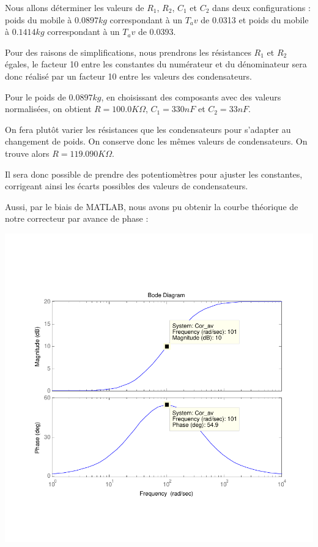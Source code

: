 \documentclass[11pt, french]{article} %
\begin{document}
Nous allons déterminer les valeurs de $R_1$, $R_2$, $C_1$ et $C_2$ dans deux configurations : poids du mobile à $0.0897 kg$ correspondant à un $T_av$ de 0.0313 et poids du mobile à $0.1414 kg$ correspondant à un $T_av$ de 0.0393.


Pour des raisons de simplifications, nous prendrons les résistances $R_1$ et $R_2$ égales, le facteur 10 entre les constantes du numérateur et du dénominateur sera donc réalisé par un facteur 10 entre les valeurs des condensateurs. 


Pour le poids de $0.0897 kg$, en choisissant des composants avec des valeurs normalisées, on obtient $R=100.0 K\Omega$, $C_1=330 nF$ et $C_2=33 nF$. 


On fera plutôt varier les résistances que les condensateurs pour s'adapter au changement de poids. On conserve donc les mêmes valeurs de condensateurs. On trouve alors $R=119.090 K\Omega$. 


Il sera donc possible de prendre des potentiomètres pour ajuster les constantes, corrigeant ainsi les écarts possibles des valeurs de condensateurs. 


Aussi, par le biais de MATLAB, nous avons pu obtenir la courbe théorique de notre correcteur par avance de phase :

\begin{center}
\includegraphics[scale = 0.8]{SolutionAnalogique/BodeAvPhase.pdf} 
\end{center}
\end{document}
